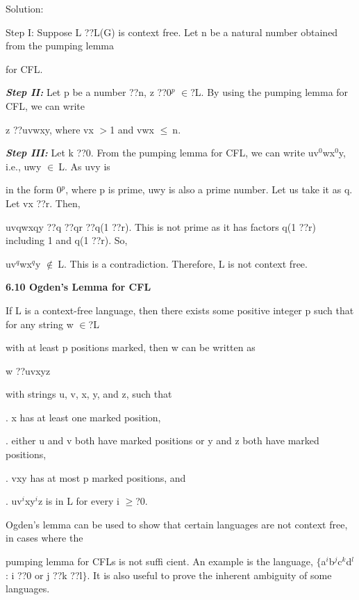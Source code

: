 \noindent Solution:

\noindent Step I: Suppose L ??L(G) is context free. Let n be a natural number obtained from the pumping lemma

\noindent for CFL.

\noindent 

\noindent 

\noindent 

\noindent 

\noindent \textbf{\textit{Step II: }}Let p be a number ??n, z ??0${}^{p}$ $\in $?L. By using the pumping lemma for CFL, we can write

\noindent z ??uvwxy, where {\textbar} vx {\textbar} $>$1 and {\textbar} vwx {\textbar} $\le \ $n.

\noindent \textbf{\textit{Step III: }}Let k ??0. From the pumping lemma for CFL, we can write uv${}^{0}$wx${}^{0}$y, i.e., uwy $\in \ $L. As uvy is

\noindent in the form 0${}^{p}$, where p is prime, {\textbar} uwy {\textbar} is also a prime number. Let us take it as q. Let {\textbar} vx {\textbar} ??r. Then,

\noindent {\textbar} uvqwxqy {\textbar} ??q ??qr ??q(1 ??r). This is not prime as it has factors q(1 ??r) including 1 and q(1 ??r). So,

\noindent uv${}^{q}$wx${}^{q}$y $\notin \ $L. This is a contradiction. Therefore, L is not context free.

\noindent \textbf{6.10 Ogden's Lemma for CFL}

\noindent If L is a context-free language, then there exists some positive integer p such that for any string w $\in $?L

\noindent with at least p positions marked, then w can be written as

\noindent w ??uvxyz

\noindent with strings u, v, x, y, and z, such that

. x has at least one marked position,

. either u and v both have marked positions or y and z both have marked positions,

. vxy has at most p marked positions, and

. uv${}^{i}$xy${}^{i}$z is in L for every i $\ge $?0.

\noindent Ogden's lemma can be used to show that certain languages are not context free, in cases where the

\noindent pumping lemma for CFLs is not suffi cient. An example is the language, $\mathrm{\{}$a${}^{i}$b${}^{j}$c${}^{k}$d${}^{l}$: i ??0 or j ??k ??l$\mathrm{\}}$. It is also useful to prove the inherent ambiguity of some languages.

